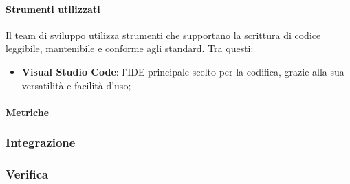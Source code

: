    \paragraph{Strumenti utilizzati}
    Il team di sviluppo utilizza strumenti che supportano la scrittura di codice leggibile, mantenibile e conforme agli standard. Tra questi:
    \begin{itemize}
        \item \textbf{Visual Studio Code}: l'IDE principale scelto per la codifica, grazie alla sua versatilità e facilità d'uso;
    \end{itemize}
    
    \paragraph{Metriche}

    
    \subsubsection{Integrazione}
    
    \subsubsection{Verifica}


